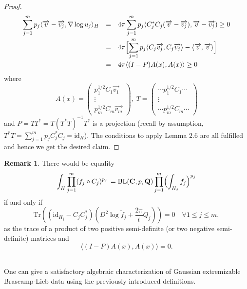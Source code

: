 \documentclass[11pt,a4paper,reqno]{amsart}
\numberwithin{equation}{section}
\theoremstyle{definition}
\newtheorem{remark}[theorem]{Remark}
\newcommand{\nm}{\noalign{\smallskip}}
\newcommand{\ds}{\displaystyle}
\renewcommand{\tilde}{\widetilde}
\newcommand{\<}{\ensuremath \leq}
\renewcommand{\>}{\ensuremath \geq}
\renewcommand{\tilde}{\widetilde}
\begin{document}
\begin{proof}
$$\begin{array}{lll}
\ds \sum_{j=1}^m p_j \langle \overrightarrow{v}-\overrightarrow{v_j},\nabla \log u_j\rangle_H &=& \ds 4\pi \sum_{j=1}^m p_j \langle C_j^*C_j(\overrightarrow{v}-\overrightarrow{v_j}),\overrightarrow{v}-\overrightarrow{v_j}) \geq 0 \\
\nm 
&=& \ds 4\pi \Bigl[ \sum_{j=1}^m p_j \langle C_j\overrightarrow{v_j},C_j\overrightarrow{v_j}\rangle-\langle \overrightarrow{v},\overrightarrow{v} \rangle \Bigl] \\
\nm 
&=& 4\pi \langle (I-P)A(x),A(x) \rangle \geq 0
\end{array}$$ where $$A(x)=\begin{pmatrix}
    p_1^{1/2}C_1\overrightarrow{v_1} \\
    \vdots \\
    p_m^{1/2}C_m\overrightarrow{v_m}
\end{pmatrix}, \; T=\begin{pmatrix}
    \cdots p_1^{1/2}C_1 \cdots \\
    \vdots \\
    \cdots p_m^{1/2}C_m \cdots
\end{pmatrix}$$ and $P=TT^*=T(T^*T)^{-1}T^*$ is  a projection (recall by assumption, $T^*T=\sum_{j=1}^m p_jC_j^*C_j=\mathrm{id}_{H}$). The conditions to apply Lemma $2.6$ are all fulfilled and hence we get the desired claim. 
\end{proof}


\begin{remark} \label{Important_rk_equality_cases}
There would be equality $$\int_H \prod_{j=1}^m (f_j \circ C_j)^{p_j} \, = \mathrm{BL}(\textbf{C},p,\textbf{Q})\prod_{j=1}^m \Bigl( \int_{H_j}f_j\Bigl)^{p_j}$$ if and only if $$\mathrm{Tr}((\mathrm{id}_{H_j}-C_jC_j^*)(D^2\log \tilde f_j+\frac{2\pi}{t}Q_j))=0 \quad \forall 1 \le j \le m, $$ as the trace of a product of two positive semi-definite (or two negative semi-definite) matrices and $$\langle (I-P)A(x),A(x)\rangle=0.$$ 
\end{remark}

\hfill \\


One can give a satisfactory algebraic characterization of Gaussian extremizable Brascamp-Lieb data using the previously introduced definitions. 
\end{document}
